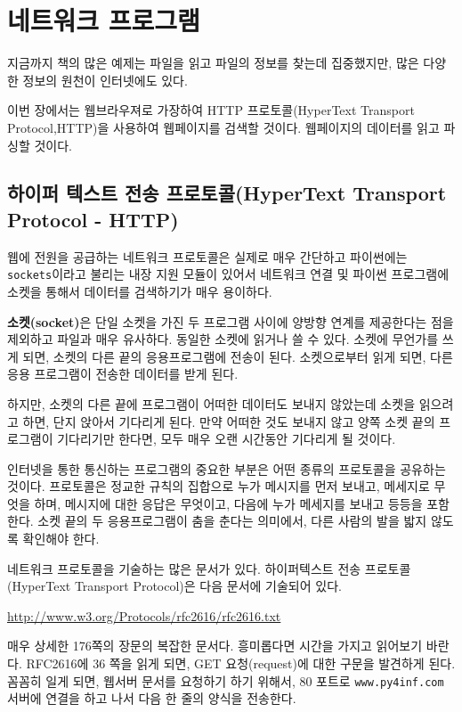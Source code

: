 
\chapter{네트워크 프로그램}
지금까지 책의 많은 예제는 파일을 읽고 파일의 정보를 찾는데 집중했지만, 
많은 다양한 정보의 원천이 인터넷에도 있다.

이번 장에서는 웹브라우져로 가장하여 HTTP 프로토콜(HyperText Transport Protocol,HTTP)을 사용하여 웹페이지를 
검색할 것이다. 웹페이지의 데이터를 읽고 파싱할 것이다.

\section{하이퍼 텍스트 전송 프로토콜(HyperText Transport Protocol - HTTP)}
웹에 전원을 공급하는 네트워크 프로토콜은 실제로 매우 간단하고 파이썬에는 {\tt sockets}이라고 불리는 내장 지원 모듈이 있어서 
네트워크 연결 및 파이썬 프로그램에 소켓을 통해서 데이터를 검색하기가 매우 용이하다.

{\bf 소켓(socket)}은 단일 소켓을 가진 두 프로그램 사이에 양방향 연계를 제공한다는 점을 제외하고 파일과 매우 유사하다.
동일한 소켓에 읽거나 쓸 수 있다. 소켓에 무언가를 쓰게 되면, 소켓의 다른 끝의 응용프로그램에 전송이 된다. 소켓으로부터 읽게 되면,
다른 응용 프로그램이 전송한 데이터를 받게 된다.

하지만, 소켓의 다른 끝에 프로그램이 어떠한 데이터도 보내지 않았는데 소켓을 읽으려고 하면, 단지 앉아서 기다리게 된다.
만약 어떠한 것도 보내지 않고 양쪽 소켓 끝의 프로그램이 기다리기만 한다면, 모두 매우 오랜 시간동안 기다리게 될 것이다.

인터넷을 통한 통신하는 프로그램의 중요한 부분은 어떤 종류의 프로토콜을 공유하는 것이다.
프로토콜은 정교한 규칙의 집합으로 누가 메시지를 먼저 보내고, 메세지로 무엇을 하며, 메시지에 대한 응답은 무엇이고, 다음에 누가 메세지를 보내고 등등을 포함한다.
소켓 끝의 두 응용프로그램이 춤을 춘다는 의미에서, 다른 사람의 발을 밟지 않도록 확인해야 한다.


네트워크 프로토콜을 기술하는 많은 문서가 있다. 하이퍼텍스트 전송 프로토콜(HyperText Transport Protocol)은 다음 문서에 기술되어 있다.

\url{http://www.w3.org/Protocols/rfc2616/rfc2616.txt}

매우 상세한 176쪽의 장문의 복잡한 문서다. 흥미롭다면 시간을 가지고 읽어보기 바란다. RFC2616에 36 쪽을 읽게 되면,
GET 요청(request)에 대한 구문을 발견하게 된다. 꼼꼼히 일게 되면, 웹서버 문서를 요청하기 하기 위해서, 80 포트로 {\tt www.py4inf.com} 서버에 
연결을 하고 나서 다음 한 줄의 양식을 전송한다.

